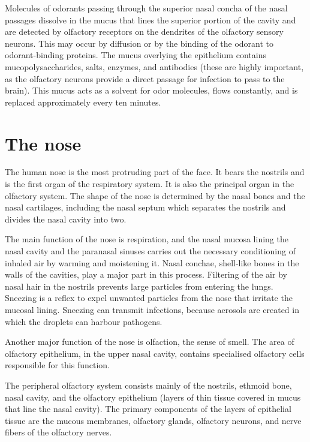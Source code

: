 \documentclass[]{book}
\begin{document}
Molecules of odorants passing through the superior nasal concha of the nasal passages dissolve in the mucus that lines the superior portion of the cavity and are detected by olfactory receptors on the dendrites of the olfactory sensory neurons. This may occur by diffusion or by the binding of the odorant to odorant-binding proteins. The mucus overlying the epithelium contains mucopolysaccharides, salts, enzymes, and antibodies (these are highly important, as the olfactory neurons provide a direct passage for infection to pass to the brain). This mucus acts as a solvent for odor molecules, flows constantly, and is replaced approximately every ten minutes.

\hypertarget{the-nose}{%
\section{The nose}\label{the-nose}}

The human nose is the most protruding part of the face. It bears the nostrils and is the first organ of the respiratory system. It is also the principal organ in the olfactory system. The shape of the nose is determined by the nasal bones and the nasal cartilages, including the nasal septum which separates the nostrils and divides the nasal cavity into two.

The main function of the nose is respiration, and the nasal mucosa lining the nasal cavity and the paranasal sinuses carries out the necessary conditioning of inhaled air by warming and moistening it. Nasal conchae, shell-like bones in the walls of the cavities, play a major part in this process. Filtering of the air by nasal hair in the nostrils prevents large particles from entering the lungs. Sneezing is a reflex to expel unwanted particles from the nose that irritate the mucosal lining. Sneezing can transmit infections, because aerosols are created in which the droplets can harbour pathogens.

Another major function of the nose is olfaction, the sense of smell. The area of olfactory epithelium, in the upper nasal cavity, contains specialised olfactory cells responsible for this function.

The peripheral olfactory system consists mainly of the nostrils, ethmoid bone, nasal cavity, and the olfactory epithelium (layers of thin tissue covered in mucus that line the nasal cavity). The primary components of the layers of epithelial tissue are the mucous membranes, olfactory glands, olfactory neurons, and nerve fibers of the olfactory nerves.
\end{document}

